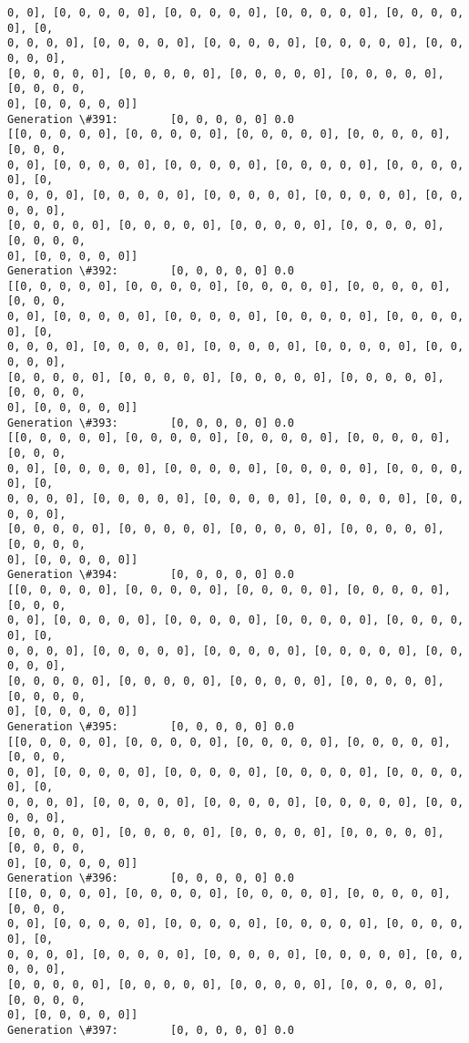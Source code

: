 \documentclass[11pt]{article}
\begin{document}
\begin{Verbatim}[commandchars=\\\{\}]
0, 0], [0, 0, 0, 0, 0], [0, 0, 0, 0, 0], [0, 0, 0, 0, 0], [0, 0, 0, 0, 0], [0,
0, 0, 0, 0], [0, 0, 0, 0, 0], [0, 0, 0, 0, 0], [0, 0, 0, 0, 0], [0, 0, 0, 0, 0],
[0, 0, 0, 0, 0], [0, 0, 0, 0, 0], [0, 0, 0, 0, 0], [0, 0, 0, 0, 0], [0, 0, 0, 0,
0], [0, 0, 0, 0, 0]]
Generation \#391:        [0, 0, 0, 0, 0] 0.0
[[0, 0, 0, 0, 0], [0, 0, 0, 0, 0], [0, 0, 0, 0, 0], [0, 0, 0, 0, 0], [0, 0, 0,
0, 0], [0, 0, 0, 0, 0], [0, 0, 0, 0, 0], [0, 0, 0, 0, 0], [0, 0, 0, 0, 0], [0,
0, 0, 0, 0], [0, 0, 0, 0, 0], [0, 0, 0, 0, 0], [0, 0, 0, 0, 0], [0, 0, 0, 0, 0],
[0, 0, 0, 0, 0], [0, 0, 0, 0, 0], [0, 0, 0, 0, 0], [0, 0, 0, 0, 0], [0, 0, 0, 0,
0], [0, 0, 0, 0, 0]]
Generation \#392:        [0, 0, 0, 0, 0] 0.0
[[0, 0, 0, 0, 0], [0, 0, 0, 0, 0], [0, 0, 0, 0, 0], [0, 0, 0, 0, 0], [0, 0, 0,
0, 0], [0, 0, 0, 0, 0], [0, 0, 0, 0, 0], [0, 0, 0, 0, 0], [0, 0, 0, 0, 0], [0,
0, 0, 0, 0], [0, 0, 0, 0, 0], [0, 0, 0, 0, 0], [0, 0, 0, 0, 0], [0, 0, 0, 0, 0],
[0, 0, 0, 0, 0], [0, 0, 0, 0, 0], [0, 0, 0, 0, 0], [0, 0, 0, 0, 0], [0, 0, 0, 0,
0], [0, 0, 0, 0, 0]]
Generation \#393:        [0, 0, 0, 0, 0] 0.0
[[0, 0, 0, 0, 0], [0, 0, 0, 0, 0], [0, 0, 0, 0, 0], [0, 0, 0, 0, 0], [0, 0, 0,
0, 0], [0, 0, 0, 0, 0], [0, 0, 0, 0, 0], [0, 0, 0, 0, 0], [0, 0, 0, 0, 0], [0,
0, 0, 0, 0], [0, 0, 0, 0, 0], [0, 0, 0, 0, 0], [0, 0, 0, 0, 0], [0, 0, 0, 0, 0],
[0, 0, 0, 0, 0], [0, 0, 0, 0, 0], [0, 0, 0, 0, 0], [0, 0, 0, 0, 0], [0, 0, 0, 0,
0], [0, 0, 0, 0, 0]]
Generation \#394:        [0, 0, 0, 0, 0] 0.0
[[0, 0, 0, 0, 0], [0, 0, 0, 0, 0], [0, 0, 0, 0, 0], [0, 0, 0, 0, 0], [0, 0, 0,
0, 0], [0, 0, 0, 0, 0], [0, 0, 0, 0, 0], [0, 0, 0, 0, 0], [0, 0, 0, 0, 0], [0,
0, 0, 0, 0], [0, 0, 0, 0, 0], [0, 0, 0, 0, 0], [0, 0, 0, 0, 0], [0, 0, 0, 0, 0],
[0, 0, 0, 0, 0], [0, 0, 0, 0, 0], [0, 0, 0, 0, 0], [0, 0, 0, 0, 0], [0, 0, 0, 0,
0], [0, 0, 0, 0, 0]]
Generation \#395:        [0, 0, 0, 0, 0] 0.0
[[0, 0, 0, 0, 0], [0, 0, 0, 0, 0], [0, 0, 0, 0, 0], [0, 0, 0, 0, 0], [0, 0, 0,
0, 0], [0, 0, 0, 0, 0], [0, 0, 0, 0, 0], [0, 0, 0, 0, 0], [0, 0, 0, 0, 0], [0,
0, 0, 0, 0], [0, 0, 0, 0, 0], [0, 0, 0, 0, 0], [0, 0, 0, 0, 0], [0, 0, 0, 0, 0],
[0, 0, 0, 0, 0], [0, 0, 0, 0, 0], [0, 0, 0, 0, 0], [0, 0, 0, 0, 0], [0, 0, 0, 0,
0], [0, 0, 0, 0, 0]]
Generation \#396:        [0, 0, 0, 0, 0] 0.0
[[0, 0, 0, 0, 0], [0, 0, 0, 0, 0], [0, 0, 0, 0, 0], [0, 0, 0, 0, 0], [0, 0, 0,
0, 0], [0, 0, 0, 0, 0], [0, 0, 0, 0, 0], [0, 0, 0, 0, 0], [0, 0, 0, 0, 0], [0,
0, 0, 0, 0], [0, 0, 0, 0, 0], [0, 0, 0, 0, 0], [0, 0, 0, 0, 0], [0, 0, 0, 0, 0],
[0, 0, 0, 0, 0], [0, 0, 0, 0, 0], [0, 0, 0, 0, 0], [0, 0, 0, 0, 0], [0, 0, 0, 0,
0], [0, 0, 0, 0, 0]]
Generation \#397:        [0, 0, 0, 0, 0] 0.0

\end{Verbatim}
\end{document}
